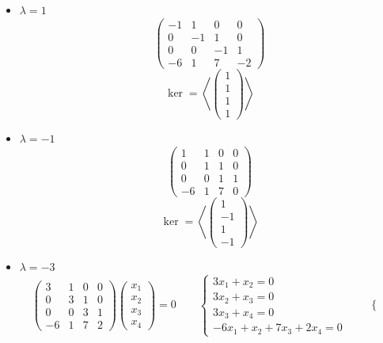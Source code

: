 \begin{itemize}
	\item $ \lambda = 1 $
    $$
    \begin{pmatrix}
    	-1 & 1 & 0 & 0 \\
        0 & -1 & 1 & 0 \\
        0 & 0 & -1 & 1 \\
        -6 & 1 & 7 & -2
    \end{pmatrix} $$
    $$ \ker = \left\langle
    \begin{pmatrix}
    	1 \\
        1 \\
        1 \\
        1
    \end{pmatrix} \right\rangle $$
    \item $ \lambda = -1 $
    $$
    \begin{pmatrix}
    	1 & 1 & 0 & 0 \\
        0 & 1 & 1 & 0 \\
        0 & 0 & 1 & 1 \\
        -6 & 1 & 7 & 0
    \end{pmatrix} $$
    $$ \ker = \left\langle
    \begin{pmatrix}
    	1 \\
        -1 \\
        1 \\
        -1
    \end{pmatrix} \right\rangle $$
    \item $ \lambda = -3 $
    $$
    \begin{pmatrix}
    	3 & 1 & 0 & 0 \\
        0 & 3 & 1 & 0 \\
        0 & 0 & 3 & 1 \\
        -6 & 1 & 7 & 2
    \end{pmatrix}
    \begin{pmatrix}
    	x_1 \\
        x_2 \\
        x_3 \\
        x_4
    \end{pmatrix} = 0 \qquad
    \begin{cases}
    	3x_1 + x_2 = 0 \\
        3x_2 + x_3 = 0 \\
        3x_3 + x_4 = 0 \\
        -6x_1 + x_2 + 7x_3 + 2x_4 = 0
    \end{cases} \qquad
    \begin{cases}

\end{cases}$$
\end{itemize}
